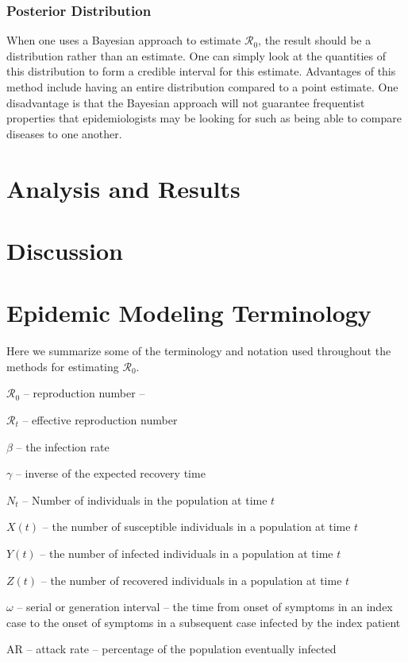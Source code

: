 \documentclass[12pt]{article}
\newcommand{\rr}{\ensuremath{\mathcal{R}_0}}
\begin{document}
\subsubsection{Posterior Distribution}
When one uses a Bayesian approach to estimate $\rr$, the result should be a distribution rather than an estimate.  One can simply look at the quantities of this distribution to form a credible interval for this estimate.  Advantages of this method include having an entire distribution compared to a point estimate.  One disadvantage is that the Bayesian approach will not guarantee frequentist properties that epidemiologists may be looking for such as being able to compare diseases to one another.







\section{Analysis and Results}
\label{sec:results}

\section{Discussion}
\label{sec:dis}


\label{sec:details}







\appendix

\section{Epidemic Modeling Terminology}
\label{sec:term}

Here we summarize some of the terminology and notation used throughout the methods for estimating \rr.

{$\rr$} -- reproduction number -- 

{$\mathcal{R}_t$} -- effective reproduction number

{$\beta$} -- the infection rate

{$\gamma$} -- inverse of the expected recovery time

{$N_t$} -- Number of individuals in the population at time $t$

{$X(t)$} -- the number of susceptible individuals in a population at time $t$

{$Y(t)$} -- the number of infected individuals in a population at time $t$

{$Z(t)$} -- the number of recovered individuals in a population at time $t$

{$\omega$} -- serial or generation interval -- the time from onset of symptoms in an index case to the onset of symptoms in a subsequent case infected by the index patient

AR -- attack rate -- percentage of the population eventually infected
\end{document}
